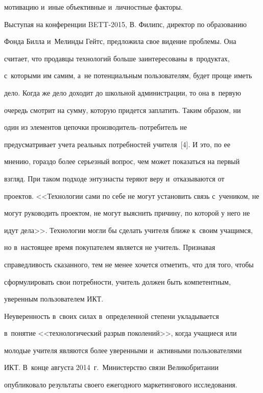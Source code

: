 мотивацию и~иные объективные и~личностные факторы. 


  


  Выступая на конференции BETT-2015, В. Филипс, директор по образованию 


Фонда Билла и~Мелинды Гейтс, предложила свое видение проблемы. Она 


считает, что продавцы технологий больше заинтересованы в~продуктах, 


с~которыми им самим, а~не потенциальным пользователям, будет проще иметь 


дело. Когда же дело доходит до школьной администрации, то она в~первую 


очередь смотрит на сумму, которую придется заплатить. Таким образом, ни 


один из элементов цепочки про\-из\-во\-ди\-тель--по\-тре\-би\-тель не 


предусматривает учета реальных потребностей учителя~[4]. И это, по ее 


мнению, гораздо более серьезный вопрос, чем может показаться на первый 


взгляд. При таком подходе энтузиасты теряют веру и~отказываются от 


проектов. <<Технологии сами по себе не могут установить связь с~учеником, не 


могут руководить проектом, не могут выяснить причину, по которой у него не 


идут дела>>. Технологии могли бы сделать учителя ближе к~своим учащимся, 


но в~настоящее время покупателем является не учитель. Признавая 


справедливость сказанного, тем не менее хочется отметить, что для того, чтобы 


сформулировать свои потребности, учитель должен быть компетентным, 


уверенным пользователем ИКТ. 


  


  Неуверенность в~своих силах в~определенной степени укладывается 


в~понятие <<технологический разрыв поколений>>, когда учащиеся или 


молодые учителя являются более уверенными и~активными пользователями 


ИКТ. В~конце августа 2014~г.\ Министерство связи Великобритании 


опубликовало результаты своего ежегодного маркетингового исследования. 


